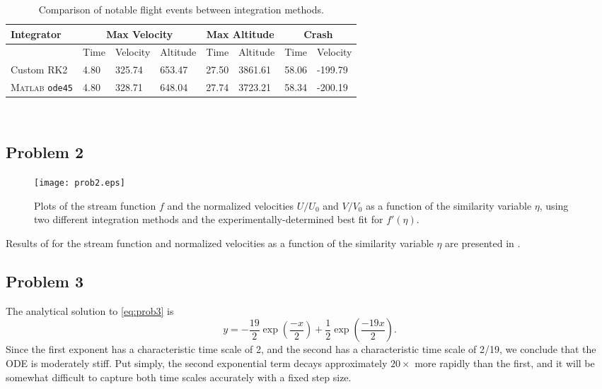 \documentclass[12pt]{article}
\begin{document}
\begin{table}[h!]
\centering
\begin{tabular}{llllllll}
\toprule
Integrator   & \multicolumn{3}{c}{Max Velocity} & \multicolumn{2}{c}{Max Altitude} & \multicolumn{2}{c}{Crash} \\
\midrule
~            & Time & Velocity & Altitude       & Time         & Altitude & Time  & Velocity \\
Custom RK2                        & 4.80 & 325.74   & 653.47  & 27.50  & 3861.61  & 58.06 & -199.79  \\
\textsc{Matlab} \lstinline|ode45| & 4.80 & 328.71   & 648.04  & 27.74  & 3723.21  & 58.34 & -200.19 \\
\bottomrule
\end{tabular}
\\[6pt]
\caption{Comparison of notable flight events between integration methods.}
\label{tbl:rocket}
\end{table}

\subsection{Problem 2}

\begin{figure}[t]
\begin{center}
\texttt{[image: prob2.eps]}
\\
\caption{Plots of the stream function $f$ and the normalized velocities $U/U_0$ and $V/V_0$ as a function of the similarity variable $\eta$, using two different integration methods and the experimentally-determined best fit for $f'(\eta)$.}
\label{fig:prob2}
\end{center}
\end{figure}

Results of for the stream function and normalized velocities as a function of the similarity variable $\eta$ are presented in .

\subsection{Problem 3}

The analytical solution to \eqref{eq:prob3} is
\begin{equation}
y = -\frac{19}{2} \exp \left( \frac{-x}{2} \right) + \frac{1}{2} \exp \left( \frac{-19x}{2} \right)
.
\label{eq:prob3_analytic}
\end{equation}
Since the first exponent has a characteristic time scale of 2, and the second has a characteristic time scale of 2/19, we conclude that the ODE is moderately stiff. Put simply, the second exponential term decays approximately $20\times$ more rapidly than the first, and it will be somewhat difficult to capture both time scales accurately with a fixed step size.
\end{document}
